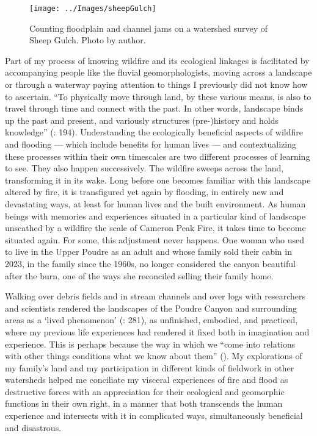 \documentclass[
]{article}
\begin{document}
\begin{figure}
\texttt{[image: ../Images/sheepGulch]} \caption[Sheep Creek survey]{Counting floodplain and channel jams on a watershed survey of Sheep Gulch. Photo by author.}\label{fig:figureTitle7}
\end{figure}

Part of my process of knowing wildfire and its ecological linkages is facilitated by accompanying people like the fluvial geomorphologists, moving across a landscape or through a waterway paying attention to things I previously did not know how to ascertain. ``To physically move through land, by these various means, is also to travel through time and connect with the past. In other words, landscape binds up the past and present, and variously structures (pre-)history and holds knowledge'' (: 194). Understanding the ecologically beneficial aspects of wildfire and flooding --- which include benefits for human lives --- and contextualizing these processes within their own timescales are two different processes of learning to see. They also happen successively. The wildfire sweeps across the land, transforming it in its wake. Long before one becomes familiar with this landscape altered by fire, it is transfigured yet again by flooding, in entirely new and devastating ways, at least for human lives and the built environment. As human beings with memories and experiences situated in a particular kind of landscape unscathed by a wildfire the scale of Cameron Peak Fire, it takes time to become situated again. For some, this adjustment never happens. One woman who used to live in the Upper Poudre as an adult and whose family sold their cabin in 2023, in the family since the 1960s, no longer considered the canyon beautiful after the burn, one of the ways she reconciled selling their family home.

Walking over debris fields and in stream channels and over logs with researchers and scientists rendered the landscapes of the Poudre Canyon and surrounding areas as a `lived phenomenon' (: 281), as unfinished, embodied, and practiced, where my previous life experiences had rendered it fixed both in imagination and experience. This is perhaps because the way in which we ``come into relations with other things conditions what we know about them'' (). My explorations of my family's land and my participation in different kinds of fieldwork in other watersheds helped me conciliate my visceral experiences of fire and flood as destructive forces with an appreciation for their ecological and geomorphic functions in their own right, in a manner that both transcends the human experience and intersects with it in complicated ways, simultaneously beneficial and disastrous.
\end{document}
